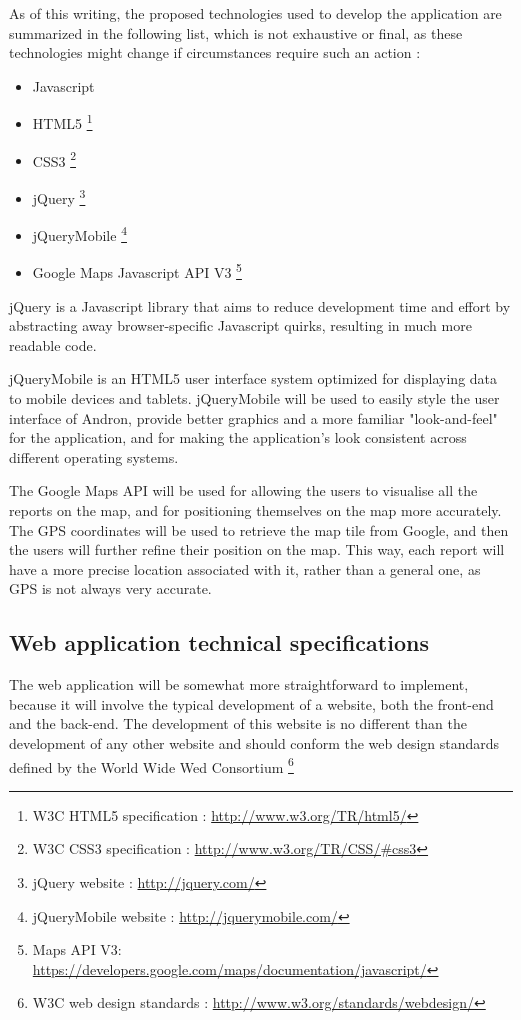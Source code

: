 \documentclass[12pt]{ecsproject}     %
\begin{document}
As of this writing, the proposed technologies used to develop the application are summarized in the following list, which is not exhaustive or final, as these technologies might change if circumstances require such an action :
\begin{itemize}
	\item Javascript
	\item HTML5 \footnote{W3C HTML5 specification : \hyperlink{http://www.w3.org/TR/html5/}{http://www.w3.org/TR/html5/}} 
	\item CSS3 \footnote{W3C CSS3 specification : \hyperlink{http://www.w3.org/TR/CSS/\#css3}{http://www.w3.org/TR/CSS/\#css3}} 
	\item jQuery \footnote{jQuery website : \hyperlink{http://jquery.com/}{http://jquery.com/}}
	\item jQueryMobile \footnote{ jQueryMobile website :  \hyperlink{http://jquerymobile.com/}{http://jquerymobile.com/}} 
	\item Google Maps Javascript API V3 \footnote{ Maps API V3:  \hyperlink{https://developers.google.com/maps/documentation/javascript/}{https://developers.google.com/maps/documentation/javascript/}} 
\end{itemize}

jQuery is a Javascript library that aims to reduce development time and effort by abstracting away browser-specific Javascript quirks, resulting in much more readable code.

jQueryMobile is an HTML5 user interface system optimized for displaying data to mobile devices and tablets. jQueryMobile will be used to easily style the user interface of Andron, provide better graphics and a more familiar "look-and-feel" for the application, and for making the application's look consistent across different operating systems.

The Google Maps API will be used for allowing the users to visualise all the reports on the map, and for positioning themselves on the map more accurately. The GPS coordinates will be used to retrieve the map tile from Google, and then the users will further refine their position on the map. This way, each report will have a more precise location associated with it, rather than a general one, as GPS is not always very accurate.

\subsection{Web application technical specifications}
The web application will be somewhat more straightforward to implement, because it will involve the typical development of a website, both the front-end and the back-end. The development of this website is no different than the development of any other website and should conform the web design standards defined by the World Wide Wed Consortium \footnote{W3C web design standards : \hyperlink{http://www.w3.org/standards/webdesign/}{http://www.w3.org/standards/webdesign/}}
\end{document}
